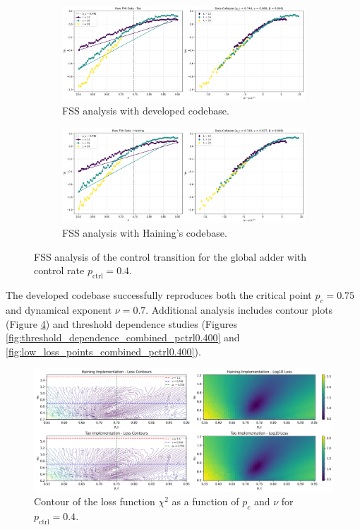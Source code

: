 \documentclass[11pt,a4paper]{article}
\begin{document}
\begin{figure}[H]
    \centering
    \begin{subfigure}[t]{0.8\linewidth}
        \centering
        \includegraphics[width=\linewidth]{data_collapse_tao_pctrl0.400_threshold1.0e-15.png}
        \caption{FSS analysis with developed codebase.}
        \label{fig:fss_analysis_developed_pctrl0.400}
    \end{subfigure}
    \vfill
    \begin{subfigure}[b]{0.8\linewidth}
        \centering
        \includegraphics[width=\linewidth]{data_collapse_haining_pctrl0.400_threshold1.0e-15.png}
        \caption{FSS analysis with Haining's codebase.}
        \label{fig:fss_analysis_haining_pctrl0.400}
    \end{subfigure}
    \caption{FSS analysis of the control transition for the global adder with control rate $p_\text{ctrl}=0.4$.}
    \label{fig:fss_analysis_combined_pctrl0.400}
\end{figure}

The developed codebase successfully reproduces both the critical point $p_c=0.75$ and dynamical exponent $\nu=0.7$. Additional analysis includes contour plots (Figure \ref{fig:chi2_contour_pctrl0.400}) and threshold dependence studies (Figures \ref{fig:threshold_dependence_combined_pctrl0.400} and \ref{fig:low_loss_points_combined_pctrl0.400}).

\begin{figure}[H]
    \centering
    \includegraphics[width=0.8\linewidth]{loss_manifold_comparison_pctrl0.400_threshold1.0e-15.png}
    \caption{Contour of the loss function $\chi^2$ as a function of $p_c$ and $\nu$ for $p_\text{ctrl}=0.4$.}
    \label{fig:chi2_contour_pctrl0.400}
\end{figure}
\end{document}
